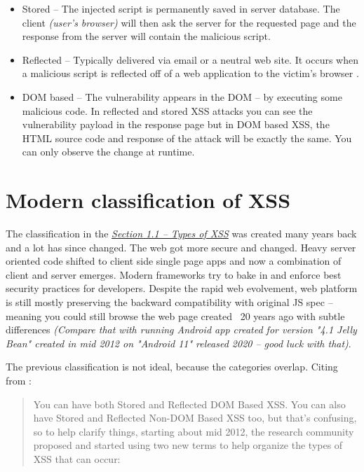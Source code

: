 \begin{itemize}
  \item  Stored -- The injected script is permanently saved in server database. The client
        \emph{(user's browser)} will then ask the server for the requested page and the response
        from the server will contain the malicious script.
  \item  Reflected -- Typically delivered via email or a neutral web site. It occurs when a malicious
        script is reflected off of a web application to the victim’s browser \cite{reflected_xss}.
  \item  DOM based -- The vulnerability appears in the DOM -- by executing some malicious code. In
        reflected and stored XSS attacks you can see the vulnerability payload in the response page
        but in DOM based XSS, the HTML source code and response of the attack will be exactly the
        same. You can only observe the change at runtime.
\end{itemize}

\section{Modern classification of XSS}

The classification in the \emph{\hyperref[chapter:xss:types]{Section 1.1 -- Types of XSS}} was
created many years back and a lot has since changed. The web got more secure and changed. Heavy
server oriented code shifted to client side single page apps and now a combination of client and
server emerges. Modern frameworks try to bake in and enforce best security practices for developers.
Despite the rapid web evolvement, web platform is still mostly preserving the backward compatibility
with original JS spec -- meaning you could still browse the web page created ~20 years ago with
subtle differences \emph{(Compare that with running Android app created for version "4.1 Jelly Bean"
  created in mid 2012 on "Android 11" released 2020 -- good luck with that)}.

The previous classification is not ideal, because the categories overlap. Citing from
\cite{xss_owasp_types}:
\begin{quotation}
  You can have both Stored and Reflected DOM Based XSS. You can also have Stored and Reflected
  Non-DOM Based XSS too, but that’s confusing, so to help clarify things, starting about mid 2012,
  the research community proposed and started using two new terms to help organize the types of XSS
  that can occur:
\end{quotation}

